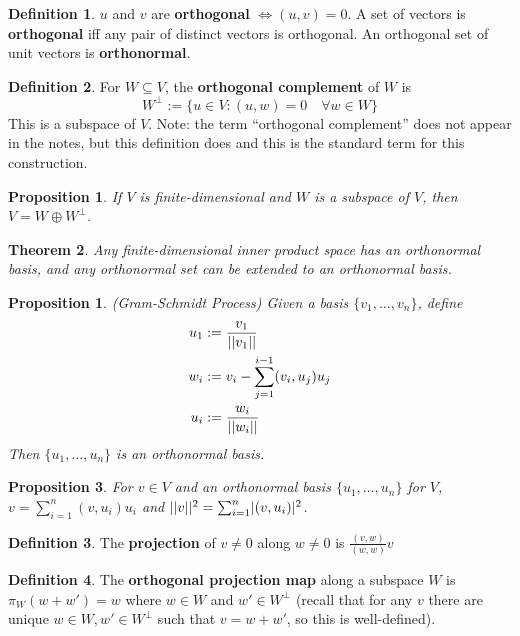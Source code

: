 \documentclass[12pt]{article}
\newtheorem{thm}{Theorem}[section]
\newtheorem{prop}[thm]{Proposition}
\newtheorem*{prop*}{Proposition}
\theoremstyle{definition}
\newtheorem*{defn*}{Definition}
\DeclarePairedDelimiter\length{\lvert\lvert}{\rvert\rvert}
\begin{document}
\begin{defn*}
	$u$ and $v$ are \textbf{orthogonal} $\iff (u, v) = 0$.
	A set of vectors is \textbf{orthogonal} iff any pair of distinct vectors is orthogonal.
	An orthogonal set of unit vectors is \textbf{orthonormal}.
\end{defn*}

\begin{defn*}
  For $W \subseteq V$, the \textbf{orthogonal complement} of $W$ is
	$$W^{\bot} := \{u \in V : (u, w) = 0\quad \forall w \in W\}$$
	This is a subspace of $V$.
  Note: the term ``orthogonal complement'' does not appear in the notes, but this definition does and this is the standard term for this construction.
\end{defn*}

\begin{prop}
	If $V$ is finite-dimensional and $W$ is a subspace of $V$, then $V = W \oplus W^{\bot}$.
\end{prop}

\begin{thm}
	Any finite-dimensional inner product space has an orthonormal basis, and any orthonormal set can be extended to an orthonormal basis.
\end{thm}

\begin{prop*}
	(Gram-Schmidt Process)
	Given a basis $\{v_1, \ldots, v_n\}$, define
	\begin{align*}
		u_1 &:= \frac{v_1}{\length{v_1}}\\
		w_i &:= v_i - \sum_{j = 1}^{i - 1}(v_i, u_j)u_j\\
		u_i &:= \frac{w_i}{\length{w_i}}
	\end{align*}
	Then $\{u_1, \ldots, u_n\}$ is an orthonormal basis.
\end{prop*}

\begin{prop}
	For $v \in V$ and an orthonormal basis $\{u_1, \ldots, u_n\}$ for $V$, $v = \sum_{i = 1}^n(v, u_i)u_i$ and $\length{v}^2 = \sum_{i = 1}^n\lvert (v, u_i) \rvert^2$.
\end{prop}

\begin{defn*}
	The \textbf{projection} of $v \neq 0$ along $w \neq 0$ is $\frac{(v, w)}{(w, w)}v$
\end{defn*}

\begin{defn*}
	The \textbf{orthogonal projection map} along a subspace $W$ is $\pi_W(w + w') = w$ where $w \in W$ and $w' \in W^{\bot}$ (recall that for any $v$ there are unique $w \in W, w' \in W^{\bot}$ such that $v = w + w'$, so this is well-defined).
\end{defn*}
\end{document}

